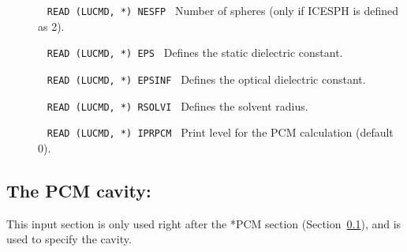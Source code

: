 \begin{description}
\item[]\verb| |\newline
\verb|READ (LUCMD, *) NESFP|\verb| |\newline
Number of spheres (only if ICESPH is defined as 2).

\item[]\verb| |\newline
\verb|READ (LUCMD, *) EPS|\verb| |\newline
Defines the static dielectric constant.

\item[]\verb| |\newline
\verb|READ (LUCMD, *) EPSINF|\verb| |\newline
Defines the optical dielectric constant.

\item[]\verb| |\newline
\verb|READ (LUCMD, *) RSOLVI|\verb| |\newline
Defines the solvent radius.

\item[]\verb| |\newline
\verb|READ (LUCMD, *) IPRPCM|\verb| |\newline
Print level for the PCM calculation (default 0).

\end{description}

\subsection{The PCM cavity: }
\label{subsec:pcmcav}

This input section is only used right after the *PCM section
(Section~\ref{subsec:pcmcav}), and is used to specify the cavity.

